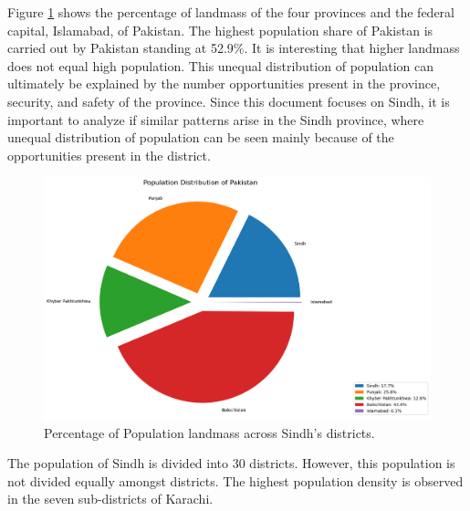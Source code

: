 \documentclass{article}
\begin{document}
\vspace{0.5cm}

\noindent Figure \ref{fig:fig3} shows the percentage of landmass of the four provinces and the federal capital, Islamabad, of Pakistan. The highest population share of Pakistan is carried out by Pakistan standing at 52.9\%. It is interesting that higher landmass does not equal high population. This unequal distribution of population can ultimately be explained by the number opportunities present in the province, security, and safety of the province. Since this document focuses on Sindh, it is important to analyze if similar patterns arise in the Sindh province, where unequal distribution of population can be seen mainly because of the opportunities present in the district. 

\begin{figure}[H]
    \centering
    \includegraphics[width=\textwidth]{../Figures/Figure03.png}
    \caption{Percentage of Population landmass across Sindh's districts.}
    \label{fig:fig3}
\end{figure}

\noindent The population of Sindh is divided into 30 districts. However, this population is not divided equally amongst districts. The highest population density is observed in the seven sub-districts of Karachi. 

\vspace{0.5cm}
\end{document}
